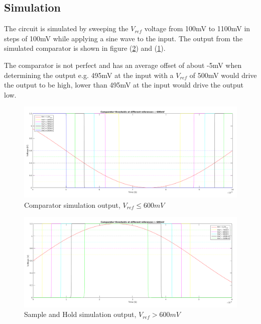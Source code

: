 \documentclass[english, 12pt, a4paper]{ifimaster}
\begin{document}
\subsection{Simulation}
The circuit is simulated by sweeping the \(V_{ref}\) voltage from 100mV to 1100mV in steps of 100mV while applying a sine wave to the input.
The output from the simulated comparator is shown in figure (\ref{figure:comparator:sim_output_greater}) and (\ref{figure:comparator:sim_output_less}).

The comparator is not perfect and has an average offset of about -5mV when determining the output e.g. 495mV at the input with a \(V_{ref}\) of 500mV would drive the output to be high,
lower than 495mV at the input would drive the output low.

\begin{figure}[!ht]
    \centering
    \includegraphics[width=\textwidth]{img/comparator/comparator_r2r_less_600m_10k_scaled}
    \caption{Comparator simulation output, \(V_{ref} \leq 600mV\) }
    \label{figure:comparator:sim_output_less}
\end{figure}

\begin{figure}[!ht]
    \centering
    \includegraphics[width=\textwidth]{img/comparator/comparator_r2r_greater_600m_10k_scaled}
    \caption{Sample and Hold simulation output, \(V_{ref} > 600mV\)}
    \label{figure:comparator:sim_output_greater}
\end{figure}
\end{document}
